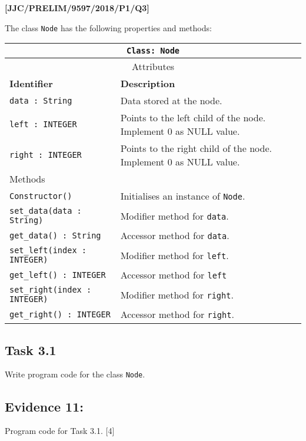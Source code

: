 \item \textbf{{[}JJC/PRELIM/9597/2018/P1/Q3{]} }

The class \texttt{Node} has the following properties and methods: 
\begin{center}
\begin{tabular}{|l|l|}
\hline 
\multicolumn{2}{|c|}{\texttt{Class: Node}}\tabularnewline
\hline 
\multicolumn{2}{|c|}{Attributes}\tabularnewline
\hline 
\texttt{\textbf{\hspace{0.01\columnwidth}}}\textbf{Identifier} & \texttt{\textbf{\hspace{0.05\columnwidth}}}\textbf{Description}\tabularnewline
\hline 
\texttt{data : String} & Data stored at the node.\tabularnewline
\hline 
\texttt{left : INTEGER} & Points to the left child of the node. Implement 0 as NULL value. \tabularnewline
\hline 
\texttt{right : INTEGER } & Points to the right child of the node. Implement 0 as NULL value.\tabularnewline
\hline 
\multicolumn{2}{|l|}{Methods}\tabularnewline
\hline 
\texttt{Constructor()} & Initialises an instance of \texttt{Node}. \tabularnewline
\hline 
\texttt{set\_data(data : String)} & Modifier method for \texttt{data}.\tabularnewline
\hline 
\texttt{get\_data() : String} & Accessor method for \texttt{data}. \tabularnewline
\hline 
\texttt{set\_left(index : INTEGER)} & Modifier method for \texttt{left}.\tabularnewline
\hline 
\texttt{get\_left() : INTEGER} & Accessor method for \texttt{left}\tabularnewline
\hline 
\texttt{set\_right(index : INTEGER)} & Modifier method for \texttt{right}.\tabularnewline
\hline 
\texttt{get\_right() : INTEGER} & Accessor method for \texttt{right}.\tabularnewline
\hline 
\end{tabular}
\par\end{center}

\subsection*{Task 3.1 }

Write program code for the class \texttt{Node}. 

\subsection*{Evidence 11:}

Program code for Task 3.1.\hfill{} {[}4{]}

